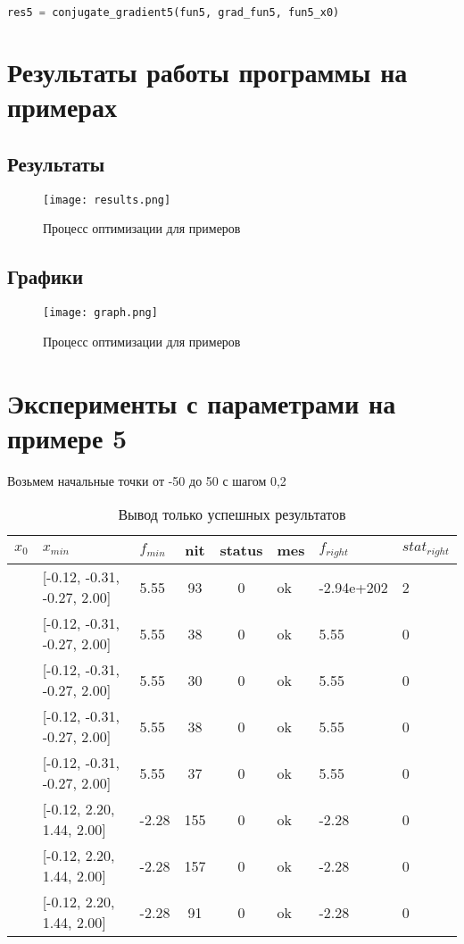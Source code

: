\documentclass{article}
\begin{document}
\begin{lstlisting}[language=Python]
res5 = conjugate_gradient5(fun5, grad_fun5, fun5_x0)
\end{lstlisting}

\newpage
\section{Результаты работы программы на примерах}
\subsection{Результаты}

\begin{figure}[H]
    \centering
    \texttt{[image: results.png]}
    \caption{Процесс оптимизации для примеров}
\end{figure}
\newpage
\subsection{Графики}

\begin{figure}[H]
    \centering
    \texttt{[image: graph.png]}
    \caption{Процесс оптимизации для примеров}
\end{figure}

\newpage
\section{Эксперименты с параметрами на примере 5}
Возьмем начальные точки от -50 до 50 с шагом 0,2

\begin{table}[h!]
\centering
\caption{Вывод только успешных результатов}
\label{tab:optimization_results}
\begin{tabular}{|l|l|l|c|c|l|l|l|}
\hline
$x_0$ & $x_{min}$ & $f_{min}$ & nit & status & mes & $f_{right}$ & $stat_{right}$ \\ \hline
[-1, -1, -1, -1] & [-0.12, -0.31, -0.27, 2.00] & 5.55 & 93 & 0 & ok & -2.94e+202 & 2 \\ \hline
[-0.4, -0.4, -0.4, -0.4] & [-0.12, -0.31, -0.27, 2.00] & 5.55 & 38 & 0 & ok & 5.55 & 0 \\ \hline
[-0.2, -0.2, -0.2, -0.2] & [-0.12, -0.31, -0.27, 2.00] & 5.55 & 30 & 0 & ok & 5.55 & 0 \\ \hline
[0, 0, 0, 0] & [-0.12, -0.31, -0.27, 2.00] & 5.55 & 38 & 0 & ok & 5.55 & 0 \\ \hline
[0.2, 0.2, 0.2, 0.2] & [-0.12, -0.31, -0.27, 2.00] & 5.55 & 37 & 0 & ok & 5.55 & 0 \\ \hline
[0.6, 0.6, 0.6, 0.6] & [-0.12, 2.20, 1.44, 2.00] & -2.28 & 155 & 0 & ok & -2.28 & 0 \\ \hline
[1.0, 1.0, 1.0, 1.0] & [-0.12, 2.20, 1.44, 2.00] & -2.28 & 157 & 0 & ok & -2.28 & 0 \\ \hline
[1.2, 1.2, 1.2, 1.2] & [-0.12, 2.20, 1.44, 2.00] & -2.28 & 91 & 0 & ok & -2.28 & 0 \\ \hline
\end{tabular}
\end{table}
\end{document}
